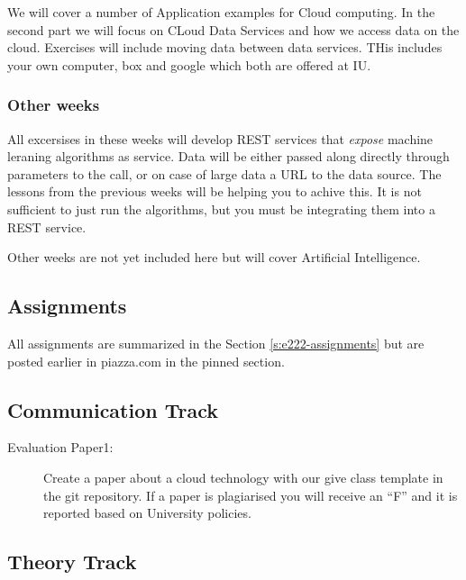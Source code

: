 We will cover a number of Application examples for Cloud computing. In
the second part we will focus on CLoud Data Services and how we access
data on the cloud. Exercises will include moving data between data
services. THis includes your own computer, box and google which both
are offered at IU.


\subsubsection{Other weeks}

All excersises in these weeks will develop REST services that {\em
  expose} machine leraning algorithms as service. Data will be either
passed along directly through parameters to the call, or on case of
large data a URL to the data source. The lessons from the previous
weeks will be helping you to achive this. It is not sufficient to just
run the algorithms, but you must be integrating them into a REST service.

Other weeks are not yet included here but will cover Artificial
Intelligence.

\subsection{Assignments}

All assignments are summarized in the Section \ref{s:e222-assignments}
but are posted earlier in piazza.com in the pinned section.


\subsection{Communication Track}




\begin{description}
\item[Evaluation Paper1:] Create a paper about a cloud technology with
  our give class template in the git repository. If a paper is
  plagiarised you will receive an ``F'' and it is reported based on
  University policies.
\end{description}

\subsection{Theory Track}

